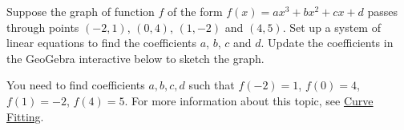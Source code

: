\documentclass{ximera}
\begin{document}
\begin{problem}\label{prob_oct_sys_4}
    Suppose the graph of function $f$ of the form $f(x)=ax^3+bx^2+cx+d$ passes through points $(-2, 1)$, $(0, 4)$, $(1, -2)$ and $(4, 5)$.   Set up a system of linear equations to find the coefficients $a$, $b$, $c$ and $d$. Update the coefficients in the GeoGebra interactive below to sketch the graph.
     
    \begin{hint}
        You need to find coefficients $a, b, c, d$ such that $f(-2)=1$, $f(0)=4$, $f(1)=-2$, $f(4)=5$.  For more information about this topic, see \href{https://ximera.osu.edu/linearalgebradzv3/LinearAlgebraInteractiveIntro/APP-0070/main}{Curve Fitting}.
    \end{hint}
     
 
   \begin{center}
    \end{center}
    
\end{problem}
 
\end{document}
